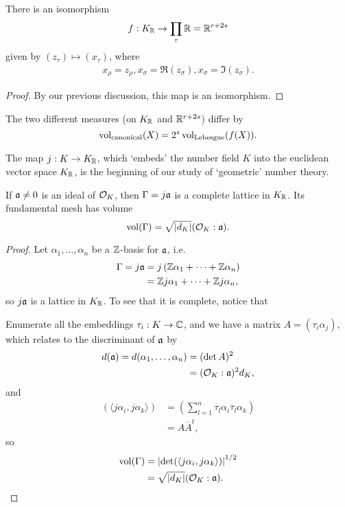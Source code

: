 \begin{prop}
	There is an isomorphism
	\[
		f : K_{\mathbb{R}} \to \prod_\tau \mathbb{R} = \mathbb{R}^{r+2s}
	\]
	given by $(z_\tau)\mapsto(x_\tau)$, where
	\begin{align*}
		x_\rho = z_\rho, x_\sigma = \Re(z_\sigma), x_{\overline{\sigma}} = \Im(z_\sigma).
	\end{align*}
\end{prop}
\begin{proof}
	By our previous discussion, this map is an isomorphism.
\end{proof}

The two different measures (on $K_{\mathbb{R}}$ and $\mathbb{R}^{r+2s}$) differ by
\[
	\operatorname{vol}_{\text{canonical}}(X) = 2^s\operatorname{vol}_{\text{Lebesgue}}(f(X)).
\]


The map $j:K\to K_{\mathbb{R}}$, which `embeds' the number field $K$ into the euclidean vector space $K_{\mathbb{R}}$, is the beginning of our study of `geometric' number theory.

\begin{prop}
	If $\mathfrak{a}\neq 0$ is an ideal of $\mathcal{O}_K$, then $\Gamma=j\mathfrak{a}$ is a complete lattice in $K_{\mathbb{R}}$. Its fundamental mesh has volume
	\[
		\operatorname{vol}(\Gamma) = \sqrt{|d_K|}(\mathcal{O}_K:\mathfrak{a}).
	\]
\end{prop}
\begin{proof}
	Let $\alpha_1,\dots,\alpha_n$ be a $\mathbb{Z}$-basis for $\mathfrak{a}$, i.e.
	\begin{align*}
		\Gamma = j\mathfrak{a} &= j\left(\mathbb{Z}\alpha_1+\cdots+\mathbb{Z}\alpha_n\right)\\
			&= \mathbb{Z} j\alpha_1 + \cdots + \mathbb{Z} j\alpha_n,
	\end{align*}
	so $j\mathfrak{a}$ is a lattice in $K_{\mathbb{R}}$. To see that it is complete, notice that

	Enumerate all the embeddings $\tau_i:K\to\mathbb{C}$, and we have a matrix $A=(\tau_i\alpha_j)$, which relates to the discriminant of $\mathfrak{a}$ by
	\begin{align*}
		d(\mathfrak{a}) = d(\alpha_1,\dots,\alpha_n) &= (\det A)^2\\
			&= (\mathcal{O}_K:\mathfrak{a})^2 d_K,
	\end{align*}
	and
	\begin{align*}
		(\langle j\alpha_i, j\alpha_k\rangle) &= (\sum_{l=1}^n \tau_l\alpha_i \overline{\tau}_l\alpha_k)\\
			&= A\overline{A}^t,
	\end{align*}
	so 
	\begin{align*}
		\operatorname{vol}(\Gamma) &= \left|\det(\langle j\alpha_i,j\alpha_k\rangle)\right|^{1/2}\\
			&= \sqrt{|d_K|}(\mathcal{O}_K:\mathfrak{a}).
	\end{align*}
\end{proof}

